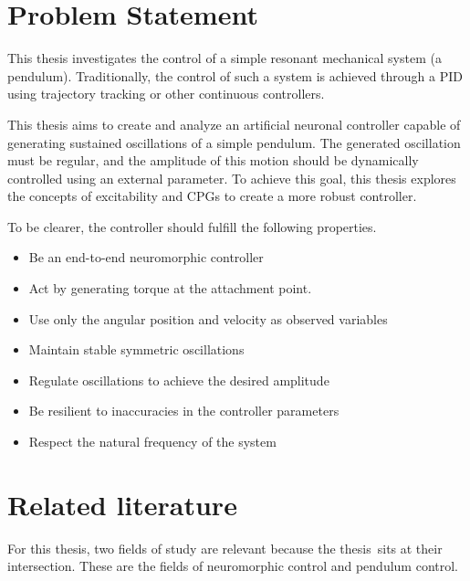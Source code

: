 \section{Problem Statement}

This thesis investigates the control of a simple resonant mechanical system (a pendulum).
Traditionally, the control of such a system is achieved through a PID using trajectory tracking or other continuous controllers. 

This thesis aims to create and analyze an artificial neuronal controller capable of generating sustained oscillations of a simple pendulum.
The generated oscillation must be regular, and the amplitude of this motion should be dynamically controlled using an external parameter.
To achieve this goal, this thesis explores the concepts of excitability and CPGs to create a more robust controller.


To be clearer, the controller should fulfill the following properties.
\begin{itemize}
    \item Be an end-to-end neuromorphic controller
    \item Act by generating torque at the attachment point.
    \item Use only the angular position and velocity as observed variables
    \item Maintain stable symmetric oscillations
    \item Regulate oscillations to achieve the desired amplitude 
    \item Be resilient to inaccuracies in the controller parameters
    \item Respect the natural frequency of the system
\end{itemize}

\section{Related literature}

For this thesis, two fields of study are relevant because the thesis sits at their intersection. These are the fields of neuromorphic control and pendulum control.

